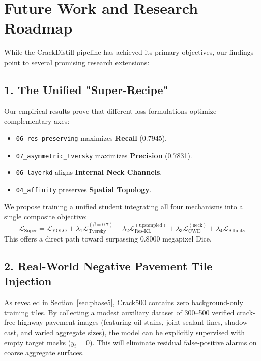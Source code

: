 \documentclass[11pt,a4paper]{article}
\begin{document}
\section{Future Work and Research Roadmap}
\label{sec:future}

While the CrackDistill pipeline has achieved its primary objectives, our findings point to several promising research extensions:

\subsection{1. The Unified "Super-Recipe"}
Our empirical results prove that different loss formulations optimize complementary axes:
\begin{itemize}[leftmargin=1.5em]
  \item \texttt{06\_res\_preserving} maximizes \textbf{Recall} (0.7945).
  \item \texttt{07\_asymmetric\_tversky} maximizes \textbf{Precision} (0.7831).
  \item \texttt{06\_layerkd} aligns \textbf{Internal Neck Channels}.
  \item \texttt{04\_affinity} preserves \textbf{Spatial Topology}.
\end{itemize}
We propose training a unified student integrating all four mechanisms into a single composite objective:
\begin{equation}
  \mathcal{L}_{\text{Super}} = \mathcal{L}_{\text{YOLO}} + \lambda_1 \mathcal{L}_{\text{Tversky}}^{(\beta=0.7)} + \lambda_2 \mathcal{L}_{\text{Res-KL}}^{(\text{upsampled})} + \lambda_3 \mathcal{L}_{\text{CWD}}^{(\text{neck})} + \lambda_4 \mathcal{L}_{\text{Affinity}}
\end{equation}
This offers a direct path toward surpassing 0.8000 megapixel Dice.

\subsection{2. Real-World Negative Pavement Tile Injection}
As revealed in Section~\ref{sec:phase5}, Crack500 contains zero background-only training tiles. 
By collecting a modest auxiliary dataset of 300--500 verified crack-free highway pavement images (featuring oil stains, joint sealant lines, shadow cast, and varied aggregate sizes), the model can be explicitly supervised with empty target masks ($y_i=0$). 
This will eliminate residual false-positive alarms on coarse aggregate surfaces.
\end{document}
